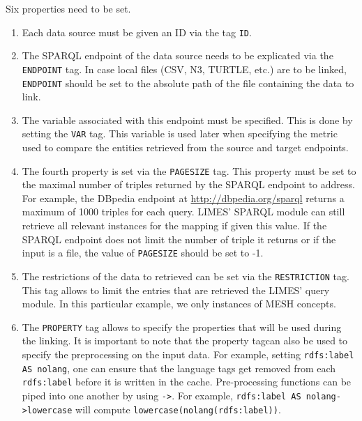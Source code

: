 \documentclass[a4paper, 11pt]{article}
\begin{document}
Six properties need to be set. 
\begin{enumerate}
\item Each data source must be given an ID via the tag \texttt{ID}.
\item The SPARQL endpoint of the data source needs to be explicated via the \texttt{ENDPOINT} tag. In case local files (CSV, N3, TURTLE, etc.) are to be linked, \texttt{ENDPOINT} should be set to the absolute path of the file containing the data to link.
\item The variable associated with this endpoint must be specified. This is done by setting the \texttt{VAR} tag. This variable is used later when specifying the metric used to compare the entities retrieved from the source and target endpoints.
\item The fourth property is set via the \texttt{PAGESIZE} tag. This property must be set to the maximal number of triples returned by the SPARQL endpoint to address. For example, the DBpedia endpoint at \url{http://dbpedia.org/sparql} returns a maximum of 1000 triples for each query. LIMES' SPARQL module can still retrieve all relevant instances for the mapping if given this value. If the SPARQL endpoint does not limit the number of triple it returns or if the input is a file, the value of \texttt{PAGESIZE} should be set to -1. 
\item The restrictions of the data to retrieved can be set via the \texttt{RESTRICTION} tag. This tag allows to limit the entries that are retrieved the LIMES' query module. In this particular example, we only instances of MESH concepts. 
\item The \texttt{PROPERTY} tag allows to specify the properties that will be used during the linking. It is important to note that the property tagcan also be used to specify the preprocessing on the input data. For example, setting \texttt{rdfs:label AS nolang}, one can ensure that the language tags get removed from each \texttt{rdfs:label} before it is written in the cache. Pre-processing functions can be piped into one another by using \texttt{->}. For example, \texttt{rdfs:label AS nolang->lowercase} will compute \texttt{lowercase(nolang(rdfs:label))}.
\end{enumerate}
\end{document}
